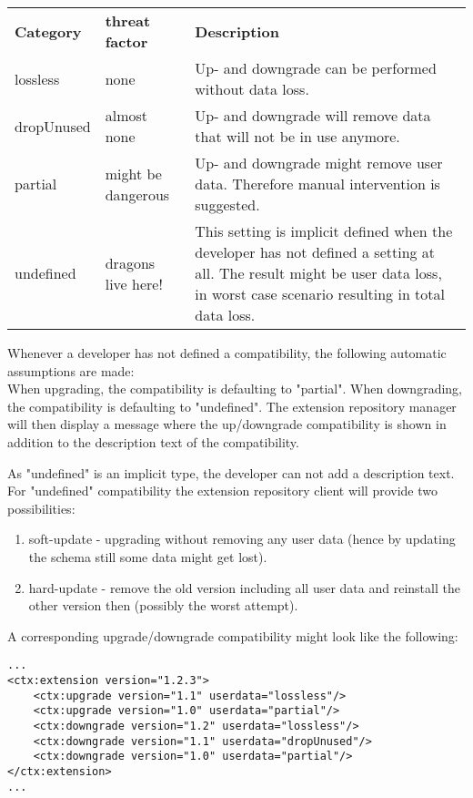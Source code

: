 \begin{tabular}{llp{}}\\
\textbf{Category} & \textbf{threat factor} & \textbf{Description}\\
lossless  & none & Up- and downgrade can be performed without data loss.\\
dropUnused  & almost none & Up- and downgrade will remove data that will not be in use anymore.\\
partial  & might be dangerous & Up- and downgrade might remove user data. Therefore manual intervention is suggested.\\
undefined & dragons live here! &This setting is implicit defined when the developer has not defined a setting at all. The result might be user data loss, in worst case scenario resulting in total data loss.\\
\end{tabular}

Whenever a developer has not defined a compatibility, the following automatic assumptions are made:\\
When upgrading, the compatibility is defaulting to "partial".
When downgrading, the compatibility is defaulting to "undefined".
The extension repository manager will then display a message where the up/downgrade compatibility is shown in addition to the description text of the compatibility.

As "undefined" is an implicit type, the developer can not add a description text. For "undefined" compatibility the extension repository client will provide two possibilities:
\begin{enumerate}
\item soft-update - upgrading without removing any user data (hence by updating the schema still some data might get lost).
\item hard-update - remove the old version including all user data and reinstall the other version then (possibly the worst attempt).
\end{enumerate}

A corresponding upgrade/downgrade compatibility might look like the following:
\lstset{language=XML} 
\begin{lstlisting}[caption=XML example: upgrade/downgrade compatibility]
...
<ctx:extension version="1.2.3">
    <ctx:upgrade version="1.1" userdata="lossless"/>
    <ctx:upgrade version="1.0" userdata="partial"/>
    <ctx:downgrade version="1.2" userdata="lossless"/>
    <ctx:downgrade version="1.1" userdata="dropUnused"/>
    <ctx:downgrade version="1.0" userdata="partial"/>
</ctx:extension>
...
\end{lstlisting}


